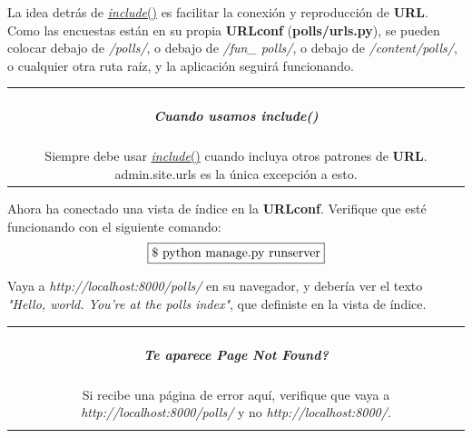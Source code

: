 \documentclass[10pt]{article}
\begin{document}
La idea detrás de {\href{https://docs.djangoproject.com/en/3.0/ref/urls/#django.urls.include}{\textcolor{B}{\textit{include}}()}} es facilitar la conexión y reproducción de \textbf{URL}. Como las encuestas están en su propia \textbf{URLconf} (\textbf{polls/urls.py}), se pueden colocar debajo de \textit{/polls/}, o debajo de \textit{/fun\_ polls/}, o debajo de \textit{/content/polls/}, o cualquier otra ruta raíz, y la aplicación seguirá funcionando.

\begin{table}[H]
	\begin{tabular}{||c||}
	\hline \\
	\begin{Large}
	\textbf{\textit{Cuando usamos include()}}
	\end{Large}
	\\\\		
Siempre debe usar {\href{https://docs.djangoproject.com/en/3.0/ref/urls/#django.urls.include}{\textcolor{B}{\textit{include}}()}} cuando incluya otros patrones de \textbf{URL}. \textcolor{G}{admin.site.urls} es la única excepción a esto.
\\ \hline 	
			\end{tabular}
		\end{table}		


Ahora ha conectado una vista de índice en la \textbf{URLconf}. Verifique que esté funcionando con el siguiente comando:
$$\fbox{\$ python manage.py runserver}$$


Vaya a \textit{http://localhost:8000/polls/} en su navegador, y debería ver el texto \textit{"Hello, world. You're at the polls index"}, que definiste en la vista de índice.

\begin{table}[H]
	\begin{tabular}{||c||}
	\hline \\
	\begin{Large}
	\textbf{\textit{Te aparece \textbf{Page Not Found?}}}
	\end{Large}
	\\\\		
Si recibe una página de error aquí, verifique que vaya a \textit{http://localhost:8000/polls/} y no \textit{http://localhost:8000/}.
\\\\ \hline 	
			\end{tabular}
		\end{table}		
\end{document}

